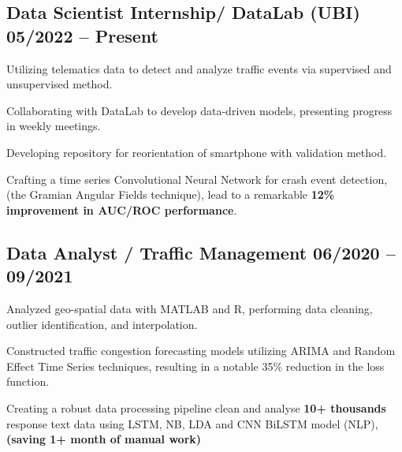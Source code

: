 \subsection{{Data Scientist Internship/ DataLab (UBI)  
\hfill {05/2022 -- Present}}}
\begin{zitemize}
\item Utilizing telematics data to detect and analyze traffic events via supervised and unsupervised method.
\item Collaborating with DataLab to develop data-driven models, presenting progress in weekly meetings.
\item Developing repository for reorientation of smartphone with validation method.
\item Crafting a time series Convolutional Neural Network for crash event detection,  (the Gramian Angular Fields technique), lead to a remarkable \textbf{12\% improvement in AUC/ROC performance}.


\end{zitemize}

\subsection{{Data Analyst / Traffic Management  
\hfill  {06/2020 -- 09/2021}}}
\begin{zitemize}
\item Analyzed geo-spatial data with MATLAB and R, performing data cleaning, outlier identification, and interpolation.\\
\item Constructed traffic congestion forecasting models utilizing ARIMA and Random Effect Time Series techniques, resulting in a notable 35\% reduction in the loss function.
\item Creating a robust data processing pipeline clean and analyse \textbf{10+ thousands} response text data using LSTM, NB, LDA and CNN BiLSTM model (NLP),  \textbf{(saving 1+ month of manual work)}
\end{zitemize}

